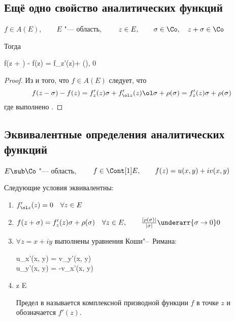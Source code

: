 \subsection{Ещё одно свойство аналитических функций}

\begin{statement}
	$ f \in A(E), \qquad E $ "--- область, $ \qquad z \in E, \qquad \sigma \in \Co, \quad z + \sigma \in \Co $

	Тогда
	\begin{equ}{16}
		f(z + \sigma) - f(z) = f_z'(z)\sigma + \rho(\sigma), \qquad \frac{|\rho(\sigma)|}{|\sigma|}  0
	\end{equ}
\end{statement}

\begin{proof}
	Из  и того, что $ f \in A(E) $ следует, что
	$$ f(z - \sigma) - f(z) = f_z'(z)\sigma + f_{\ol z}'(z)\ol \sigma + \rho(\sigma) = f_z'(z)\sigma + \rho(\sigma) $$
	где выполнено .
\end{proof}

\subsection{Эквивалентные определения аналитических функций}

\begin{theorem}
	$ E \sub \Co $ "--- область, $ \qquad f \in \Cont[1] E, \qquad f(z) = u(x, y) + iv(x, y) $

	Следующие условия эквивалентны:
	\begin{enumerate}
		\item $ f_{\ol z}'(z) = 0 \quad \forall z \in E $
		\item $ f(z + \sigma) = f_z'(z)\sigma + \rho(\sigma) \quad \forall z \in E, \qquad \frac{|\rho(\sigma)|}{|\sigma|} \underarr{\sigma \to 0} 0 $
		\item $ \forall z = x + iy $ выполнены уравнения Коши"--~Римана:
		\begin{equ}{18}
			\begin{rcases}
				u_x'(x, y) = v_y'(x, y) \\
				u_y'(x, y) = -v_x'(x, y)
			\end{rcases}
		\end{equ}
		\item
		\begin{equ}{19}
			\forall z \in E \quad \exist \limz\sigma {}\sigma \in \Co
		\end{equ}
		Предел в  называется комплексной призводной функции $ f $ в точке $ z $ и обозначается $ f'(z) $.
	\end{enumerate}
\end{theorem}

